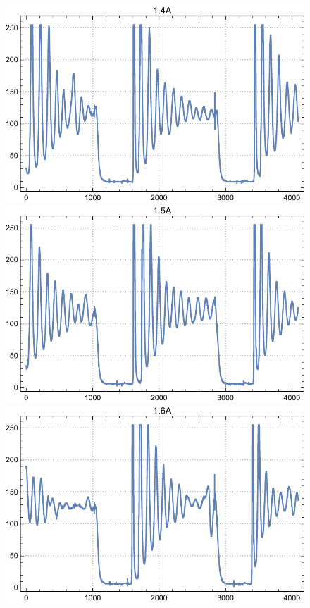 \documentclass[a4paper, 12pt]{article}
\begin{document}
\begin{enumerate}
\begin{figure}[h]
			\endminipage\hfill
			\includegraphics[width=\linewidth]{14A.pdf}
			\endminipage\hfill
			\includegraphics[width=\linewidth]{15A.pdf}
			\endminipage\hfill
			\includegraphics[width=\linewidth]{16A.pdf}

\end{figure}
\end{enumerate}
\end{document}
